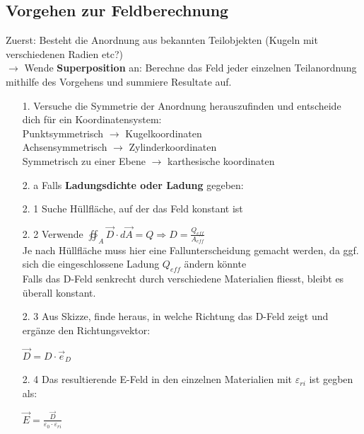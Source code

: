 \subsection{Vorgehen zur Feldberechnung}
\beginvor
Zuerst: Besteht die Anordnung aus bekannten Teilobjekten (Kugeln mit verschiedenen Radien etc?) \\
$\rightarrow$ Wende \textbf{Superposition} an: Berechne das Feld jeder einzelnen Teilanordnung mithilfe des Vorgehens und summiere Resultate auf.
\\
\begin{itemize}

	\item [1. ] Versuche die Symmetrie der Anordnung herauszufinden und entscheide dich für ein Koordinatensystem: \\
	      Punktsymmetrisch $\rightarrow$ Kugelkoordinaten \\
	      Achsensymmetrisch $\rightarrow$ Zylinderkoordinaten \\
	      Symmetrisch zu einer Ebene $\rightarrow$ karthesische koordinaten\\

	\item [2. a]Falls \textbf{Ladungsdichte oder Ladung} gegeben: \\
\end{itemize}
\beginip
\begin{itemize}

	\item [2. 1]  Suche Hüllfläche, auf der das Feld konstant ist


	\item [2. 2] Verwende $\displaystyle \oiint_A \vec{D} \cdot d\vec{A} = Q \Rightarrow D = \frac{Q_{eff}}{A_{eff}}$ \\
	      Je nach Hüllfläche muss hier eine Fallunterscheidung gemacht werden, da ggf. sich die eingeschlossene Ladung $Q_{eff}$ ändern könnte\\
	      Falls das D-Feld senkrecht durch verschiedene Materialien fliesst, bleibt es überall konstant.

	\item [2. 3] Aus Skizze, finde heraus, in welche Richtung das D-Feld zeigt und ergänze den Richtungsvektor:
	      \begin{center}
	      	$\vec{D} = D \cdot \vec{e}_D$
	      \end{center}

	\item [2. 4] Das resultierende E-Feld in den einzelnen Materialien mit $\varepsilon_{ri}$ ist gegben als:
	      \begin{center}
	      	$\displaystyle \vec{E} = \frac{\vec{D}}{\varepsilon_0 \cdot \varepsilon_{ri}}$
	      \end{center}
\end{itemize}
